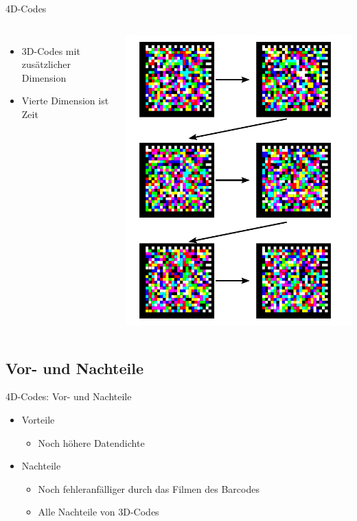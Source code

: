 \begin{frame}{4D-Codes}
	\begin{columns}
		\begin{itemize}
		\item 3D-Codes mit zusätzlicher Dimension
		\item Vierte Dimension ist Zeit
		\end{itemize}
		\includegraphics[width=\textwidth]{muzy/4d-concept.pdf}
	\end{columns}
\end{frame}

\subsection{Vor- und Nachteile}
\begin{frame}{4D-Codes: Vor- und Nachteile}
	\begin{itemize}
	\item Vorteile
		\begin{itemize}
		\item Noch höhere Datendichte
		\end{itemize}
	\item Nachteile
		\begin{itemize}
		\item Noch fehleranfälliger durch das Filmen des Barcodes
		\item Alle Nachteile von 3D-Codes
		\end{itemize}
	\end{itemize}
\end{frame}

